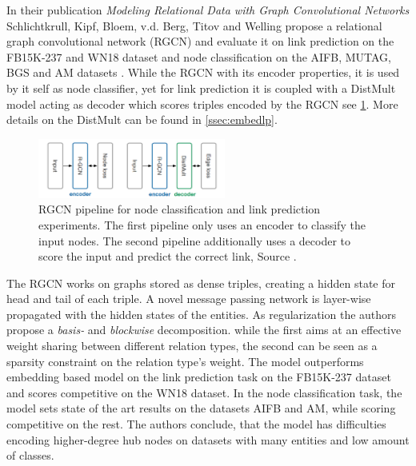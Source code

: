 

In their publication \textit{Modeling Relational Data with Graph Convolutional Networks} Schlichtkrull, Kipf, Bloem, v.d. Berg, Titov and Welling propose a relational graph convolutional network (RGCN) and evaluate it on link prediction on the FB15K-237 and WN18 dataset and node classification on the AIFB, MUTAG, BGS and AM datasets \cite{gangemi_modeling_2018}. While the RGCN with its encoder properties, it is used by it self as node classifier, yet for link prediction it is coupled with a DistMult model acting as decoder which scores triples encoded by the RGCN see \ref{fig:RGCN}. More details on the DistMult can be found in \ref{ssec:embedlp}.

\begin{figure}[h]
    \centering
    \includegraphics[width=0.55\textwidth]{data/images/RGCN.png}
    \caption{RGCN pipeline for node classification and link prediction experiments. The first pipeline only uses an encoder to classify the input nodes. The second pipeline additionally uses a decoder to score the input and predict the correct link, Source \cite{gangemi_modeling_2018}.}
    \label{fig:RGCN}
\end{figure}

The RGCN works on graphs stored as dense triples, creating a hidden state for head and tail of each triple. A novel message passing network is layer-wise propagated with the hidden states of the entities. As regularization the authors propose a \textit{basis-} and \textit{blockwise} decomposition. while the first  aims at an effective weight sharing between different relation types, the second  can be seen as a sparsity constraint on the relation type's weight. The model outperforms embedding based model on the link prediction task on the FB15K-237 dataset and scores competitive on the WN18 dataset. In the node classification task, the model sets state of the art results on the datasets AIFB and AM, while scoring competitive on the rest. The authors conclude, that the model has difficulties encoding higher-degree hub nodes on datasets with many entities and low amount of classes.


